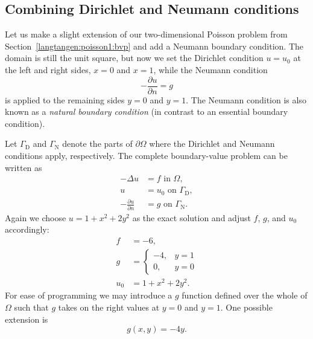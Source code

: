 \subsection{Combining Dirichlet and Neumann conditions}
\label{langtangen:poisson1:DN}

Let us make a slight extension of our two-dimensional Poisson problem
from Section~\ref{langtangen:poisson1:bvp} and add a Neumann boundary
condition. The domain is still the unit square, but now we set the
Dirichlet condition $u=u_0$ at the left and right sides, $x=0$ and $x=1$,
while the Neumann condition
\begin{equation}
 - \frac{\partial u}{\partial n} = g
\end{equation}
is applied to the remaining sides $y=0$ and $y=1$.  The Neumann condition
is also known as a \emph{natural boundary condition} (in contrast to an
essential boundary condition).  

Let $\Gamma_{\mathrm{D}}$ and $\Gamma_{\mathrm{N}}$ denote the parts of $\partial\Omega$ where
the Dirichlet and Neumann conditions apply, respectively.  The complete
boundary-value problem can be written as
\begin{align}
  -\Delta u &= f \mbox{ in } \Omega,
\\
  u &= u_0 \mbox{ on } \Gamma_{\mathrm{D}},
\\
  -\frac{\partial u}{\partial n} &= g \mbox{ on } \Gamma_{\mathrm{N}}.
\end{align}
Again we choose $u=1+x^2 + 2y^2$ as the exact solution and adjust $f$,
$g$, and $u_0$ accordingly:
\begin{align}
f &= -6,
\\
g &= \left\lbrace\begin{array}{ll}
-4, & y=1\\
0,  & y=0
\end{array}\right.
\\
u_0 &= 1 + x^2 + 2y^2.
\end{align}
For ease of programming we may introduce a $g$ function defined over
the whole of $\Omega$ such that $g$ takes on the right values at $y=0$
and $y=1$. One possible extension is
\begin{equation}
   g(x,y) = -4y.
\end{equation}

